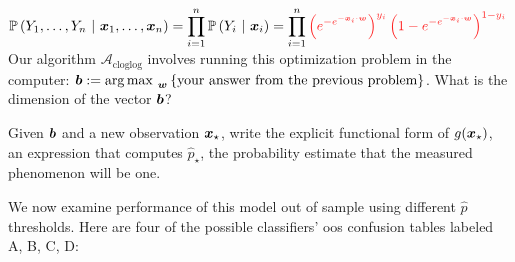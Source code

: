 \documentclass[12pt]{article}
\begin{document}
$\cprob{Y_1, \ldots, Y_n}{\x_1, \ldots, \x_n} = \displaystyle\prod_{i=1}^n \cprob{Y_i}{\x_i} =\prod_{i=1}^n \inred{\tothepow{e^{-e^{-\x_i \cdot \w}}}{y_i} \tothepow{1 - e^{-e^{-\x_i \cdot \w}}}{1 - y_i}}  $\\

 Our algorithm $\mathcal{A}_{\text{cloglog}}$ involves running this optimization problem in the computer: $\boldsymbol{b} := \operatorname*{arg\,max~}_{\boldsymbol{w}} \left\{\text{your answer from the previous problem}\right\}$. What is the dimension of the vector $\boldsymbol{b}$? ~~

 Given $\boldsymbol{b}$ and a new observation $\boldsymbol{x}_\star$, write the explicit functional form of $g(\boldsymbol{x}_\star)$, an expression that computes $\hat{p}_\star$, the probability estimate that the measured phenomenon will be one.

\vspace{-0.5cm}
We now examine performance of this model out of sample using different $\hat{p}$ thresholds. Here are four of the possible classifiers' oos confusion tables labeled A, B, C, D:
\end{document}
